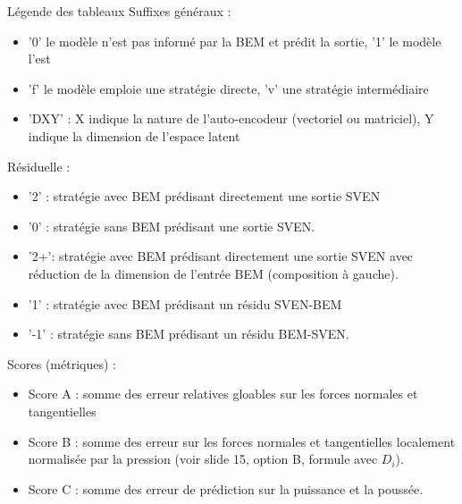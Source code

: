 \documentclass[
11pt,notheorems,hyperref={pdfauthor=whatever}
]{beamer}
\begin{document}
\begin{frame}{Légende des tableaux}
    Suffixes généraux :
    \begin{itemize}
        \item '0' le modèle n'est pas informé par la BEM et prédit la sortie, '1' le modèle l'est
        \item 'f' le modèle emploie une stratégie directe, 'v' une stratégie intermédiaire
        \item 'DXY' : X indique la nature de l'auto-encodeur (vectoriel ou matriciel), Y indique la dimension de l'espace latent
    \end{itemize}
    Résiduelle :
    \begin{itemize}
        \item '2' : stratégie avec BEM prédisant directement une sortie SVEN
        \item '0' : stratégie sans BEM prédisant une sortie SVEN.
        \item '2+': stratégie avec BEM prédisant directement une sortie SVEN avec réduction de la dimension de l'entrée BEM (composition à gauche).
        \item '1' : stratégie avec BEM prédisant un résidu SVEN-BEM
        \item '-1' : stratégie sans BEM prédisant un résidu BEM-SVEN.
     \end{itemize}
    Scores (métriques) :
     \begin{itemize}
        \item Score A : somme des erreur relatives gloables sur les forces normales et tangentielles
        \item Score B : somme des erreur sur les forces normales et tangentielles localement normalisée par la pression (voir slide 15, option B, formule avec $D_i$).
        \item Score C : somme des erreur de prédiction sur la puissance et la poussée.
    \end{itemize}
\end{frame}
\end{document}

